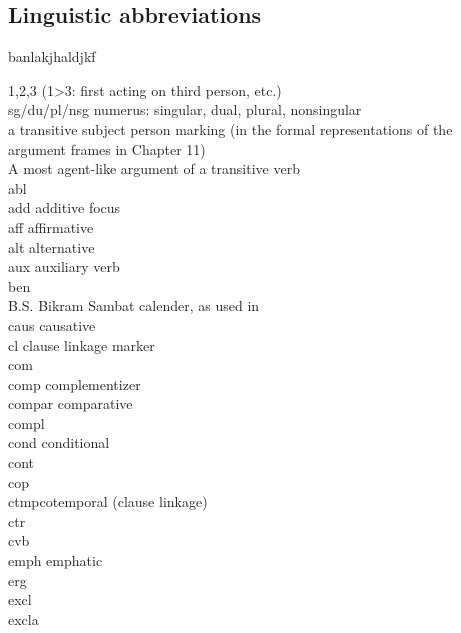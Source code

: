 \label{abbreviations}
\begin{refsection}

\section*{Linguistic abbreviations}

 {\small
\begin{tabbing}
banlakjhaldjkf\= \kill

1,2,3 		\> (1>3: first acting on third person, etc.)\\
{\sc sg/du/pl/nsg} 		\> numerus: singular, dual, plural, nonsingular\\
a		\> transitive subject person marking (in the formal representations of the argument frames in Chapter 11)\\
A		\> most agent-like argument of a transitive verb\\
{\sc abl} \> \\
{\sc add}\> additive focus\\
{\sc aff} \> affirmative\\
{\sc alt} \> alternative\\
{\sc aux}\> auxiliary verb\\
{\sc ben}		\>  \\
{\sc B.S.}		\> Bikram Sambat calender, as used in \\
{\sc caus} \> causative\\
{\sc cl}\> clause linkage marker\\
{\sc com} \> \\
{\sc comp} \> complementizer\\
{\sc compar} \> comparative\\
{\sc compl}\> \\
{\sc cond} \> conditional\\
{\sc cont}\>\\
{\sc cop} \> \\
{\sc ctmp}\>cotemporal (clause linkage)\\
{\sc ctr} \> \\
{\sc cvb} \> \\
{\sc emph} \> emphatic\\
{\sc erg} \>  \\
{\sc excl} \> \\
{\sc excla}\> \\

\end{tabbing}}
\end{refsection}
